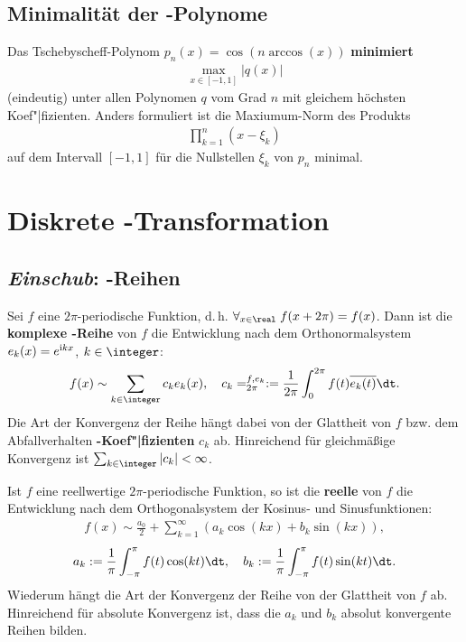 \subsection{%
    Minimalität der -Polynome%
}

Das Tschebyscheff-Polynom $p_n(x) = \cos(n \arccos(x))$ \textbf{minimiert}
\begin{align*}
    \max_{x \in [-1,1]} |q(x)|
\end{align*}
(eindeutig) unter allen Polynomen $q$ vom Grad $n$ mit gleichem höchsten
Koef"|fizienten.
Anders formuliert ist die Maxiumum-Norm des Produkts
\begin{align*}
    \prod_{k=1}^n (x - \xi_k)
\end{align*}
auf dem Intervall $[-1,1]$ für die Nullstellen $\xi_k$ von $p_n$ minimal.

\pagebreak

\section{%
    Diskrete -Transformation%
}

\subsection{%
    \emph{Einschub}: -Reihen%
}

Sei $f$ eine $2\pi$-periodische Funktion, d.\,h.
$\forall_{x \in \real}\; f(x + 2\pi) = f(x)$.
Dann ist die \textbf{komplexe -Reihe} von $f$ die Entwicklung
nach dem Orthonormalsystem $e_k(x) = e^{\mathrm{i} kx}$, $k \in \integer$:
\begin{align*}
    f(x) \sim \sum_{k \in \integer} c_k e_k(x), \quad
    c_k = \sp{f, e_k}_{2\pi} :=
    \frac{1}{2\pi} \int_0^{2\pi} f(t) \overline{e_k(t)} \dt.
\end{align*}
Die Art der Konvergenz der Reihe hängt dabei von der Glattheit von $f$ bzw.
dem Abfallverhalten \textbf{-Koef"|fizienten} $c_k$ ab.
Hinreichend für gleichmäßige Konvergenz ist
$\sum_{k \in \integer} |c_k| < \infty$.

\linie

Ist $f$ eine reellwertige $2\pi$-periodische Funktion, so ist die
\textbf{reelle } von $f$ die Entwicklung nach dem
Orthogonalsystem der Kosinus- und Sinusfunktionen:
\begin{align*}
    f(x) \sim \frac{a_0}{2} + \sum_{k=1}^\infty (a_k \cos(kx) + b_k \sin(kx)),
\end{align*}
\begin{align*}
    a_k := \frac{1}{\pi} \int_{-\pi}^\pi f(t) \cos(kt) \dt, \quad
    b_k := \frac{1}{\pi} \int_{-\pi}^\pi f(t) \sin(kt) \dt.
\end{align*}
Wiederum hängt die Art der Konvergenz der Reihe von der Glattheit von $f$ ab.
Hinreichend für absolute Konvergenz ist, dass die
 $a_k$ und $b_k$ absolut konvergente
Reihen bilden.

